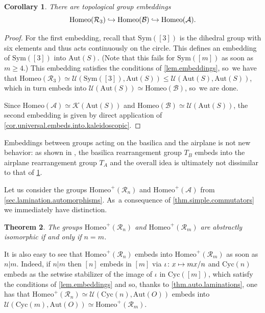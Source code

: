 \documentclass[JEP,XML,SOM,Unicode,NoFloatCountersInSection,published]{cedram}
\newcommand\mto{\mathchoice{\longmapsto}{\mapsto}{\mapsto}{\mapsto}}
\newcommand\hto{\mathrel{\lhook\joinrel\to}}
\theoremstyle{plain}
\newtheorem{theorem}{Theorem}[section]
\newtheorem{corollary}[theorem]{Corollary}
\theoremstyle{definition}
\theoremstyle{remark}
\newcommand{\Aut}{\mathrm{Aut}}
\newcommand{\Sym}{\mathrm{Sym}}
\newcommand{\Cyc}{\mathrm{Cyc}}
\newcommand{\Homeo}{\mathrm{Homeo}}
\newcommand{\A}{\mathcal{A}}
\newcommand{\B}{\mathcal{B}}
\newcommand{\R}{\mathcal{R}}
\newcommand{\U}{\mathcal{U}}
\newcommand{\K}{\mathcal{K}}
\begin{document}
\begin{corollary}
\label{cor.3.rabbit.in.basilica.in.airplane}
There are topological group embeddings\vspace*{-3pt}\enlargethispage{\baselineskip}
\[
 \Homeo(\R_3) \hto \Homeo(\B) \hto \Homeo(\A). 
\]
\end{corollary}

\begin{proof}
For the first embedding, recall that $\Sym([3])$ is the dihedral group with six elements and thus acts continuously on the circle.
This defines an embedding of $\Sym([3])$ into $\Aut(S)$.
(Note that this fails for $\Sym([m])$ as soon as $m \geq 4$.)
This embedding satisfies the conditions of \cref{lem.embeddings}, so~we have that $\Homeo(\R_3) \simeq \U(\Sym([3]),\Aut(S)) \leq \U(\Aut(S),\Aut(S))$, which in turn embeds into $\U(\Aut(S)) \simeq \Homeo(\B)$, so~we are done.

Since $\Homeo(\A) \simeq \K(\Aut(S))$ and $\Homeo(\B) \simeq \U(\Aut(S))$, the second embedding is given by direct application of \cref{cor.universal.embeds.into.kaleidoscopic}.
\end{proof}

Embeddings between groups acting on the basilica and the airplane is not new behavior:
as shown in \cite[\S 10]{airplane}, the basilica rearrangement group $T_B$ embeds into the airplane rearrangement group $T_A$ and the overall idea is ultimately not dissimilar to that of \cref{cor.3.rabbit.in.basilica.in.airplane}.


Let us consider the groups $\Homeo^+(\R_n)$ and $\Homeo^+(\A)$ from \cref{sec.lamination.automorphisms}. As~a consequence of \cref{thm.simple.commutators} we immediately have distinction.

\begin{theorem}
\label{thm.pairwise.distinction.+}
The groups $\Homeo^+(\R_n)$ and $\Homeo^+(\R_m)$ are abstractly isomorphic if and only if $n=m$.
\end{theorem}

It is also easy to see that $\Homeo^+(\R_n)$ embeds into $\Homeo^+(\R_m)$ as soon as $n|m$.
Indeed, if $n|m$ then $[n]$ embeds in $[m]$ via $\iota \colon x\mto mx/n$ and $\Cyc(n)$ embeds as the setwise stabilizer of the image of $\iota$ in $\Cyc([m])$, which satisfy the conditions of \cref{lem.embeddings} and so, thanks to \cref{thm.auto.laminations}, one has that $\Homeo^+(\R_n) \simeq \U(\Cyc(n),\Aut(O))$ embeds into $\U(\Cyc(m),\Aut(O)) \simeq \Homeo^+(\R_m)$.
\end{document}
